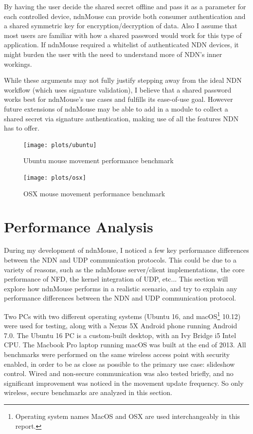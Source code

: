 \documentclass{sig-alternate}
\renewcommand\_{\textunderscore\allowbreak}  %
\begin{document}
By having the user decide the shared secret offline and pass it as a parameter for each controlled device, ndnMouse can provide both consumer authentication and a shared symmetric key for encryption/decryption of data. Also I assume that most users are familiar with how a shared password would work for this type of application. If ndnMouse required a whitelist of authenticated NDN devices, it might burden the user with the need to understand more of NDN's inner workings. 

While these arguments may not fully justify stepping away from the ideal NDN workflow (which uses signature validation), I believe that a shared password works best for ndnMouse's use cases and fulfills its ease-of-use goal. However future extensions of ndnMouse may be able to add in a module to collect a shared secret via signature authentication, making use of all the features NDN has to offer.

\begin{figure}
	\centering
	\hypertarget{fig:ubuntuBenchmark}{}
	\texttt{[image: plots/ubuntu]}
	\caption{Ubuntu mouse movement performance benchmark}
\end{figure}

\begin{figure}
	\centering
	\hypertarget{fig:osxBenchmark}{}
	\texttt{[image: plots/osx]}
	\caption{OSX mouse movement performance benchmark}
\end{figure}

\section{Performance Analysis}
During my development of ndnMouse, I noticed a few key performance differences between the NDN and UDP communication protocols. This could be due to a variety of reasons, such as the ndnMouse server/client implementations, the core performance of NFD, the kernel integration of UDP, etc... This section will explore how ndnMouse performs in a realistic scenario, and try to explain any performance differences between the NDN and UDP communication protocol.

Two PCs with two different operating systems (Ubuntu 16, and macOS\footnote{Operating system names MacOS and OSX are used interchangeably in this report.} 10.12) were used for testing, along with a Nexus 5X Android phone running Android 7.0. The Ubuntu 16 PC is a custom-built desktop, with an Ivy Bridge i5 Intel CPU. The Macbook Pro laptop running macOS was built at the end of 2013. All benchmarks were performed on the same wireless access point with security enabled, in order to be as close as possible to the primary use case: slideshow control. Wired and non-secure communication was also tested briefly, and no significant improvement was noticed in the movement update frequency. So only wireless, secure benchmarks are analyzed in this section.
\end{document}
